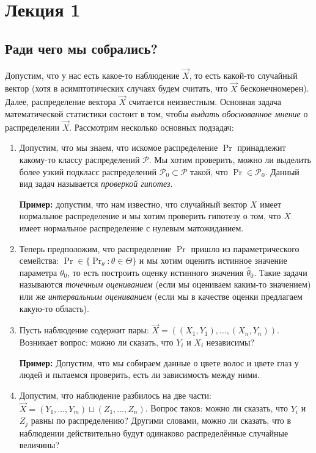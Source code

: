 
\section{Лекция 1}
\subsection{Ради чего мы собрались?}
Допустим, что у нас есть какое-то наблюдение $\vec{X}$, то есть какой-то случайный вектор (хотя в асимптотических случаях будем считать, что $\vec{X}$ бесконечномерен). 
Далее, распределение вектора $\vec{X}$ считается неизвестным.
Основная задача математической статистики состоит в том, чтобы \emph{выдать обоснованное мнение} о распределении $\vec{X}$.
Рассмотрим несколько основных подзадач:
\begin{enumerate}[label=(\alph*)]
	\item Допустим, что мы знаем, что искомое распределение $\Pr$ принадлежит какому-то классу распределений $\mathcal{P}$.
	Мы хотим проверить, можно ли выделить более узкий подкласс распределений $\mathcal{P}_{0} \subset \mathcal{P}$ такой, что $\Pr \in \mathcal{P}_{0}$.
	Данный вид задач называется \emph{проверкой гипотез}.
	
	\textbf{Пример:} допустим, что нам известно, что случайный вектор $X$ имеет нормальное распределение и мы хотим проверить гипотезу о том, что $X$ имеет нормальное распределение с нулевым матожиданием.
	
	\item Теперь предположим, что распределение $\Pr$ пришло из параметрического семейства: $\Pr \in \{\Pr_{\theta}\colon \theta \in \Theta\}$ и мы хотим оценить истинное значение параметра $\theta_{0}$, то есть построить оценку истинного значения $\hat{\theta}_{0}$.
	Такие задачи называются \emph{точечным оцениванием} (если мы оцениваем каким-то значением) или же \emph{интервальным оцениванием} (если мы в качестве оценки предлагаем какую-то область).
	
	\item Пусть наблюдение содержит пары: $\vec{X} = ((X_{1}, Y_{1}), \ldots, (X_{n}, Y_{n}))$.
	Возникает вопрос: можно ли сказать, что $Y_{i}$ и $X_{i}$ независимы? 
	
	\textbf{Пример:} Допустим, что мы собираем данные о цвете волос и цвете глаз у людей и пытаемся проверить, есть ли зависимость между ними.
	
	\item Допустим, что наблюдение разбилось на две части: $\vec{X} = (Y_{1}, \ldots, Y_{m}) \sqcup (Z_{1}, \ldots, Z_{n})$.
	Вопрос таков: можно ли сказать, что $Y_{i}$ и $Z_{j}$ равны по распределению?
	Другими словами, можно ли сказать, что в наблюдении действительно будут одинаково распределённые случайные величины? 
\end{enumerate}

